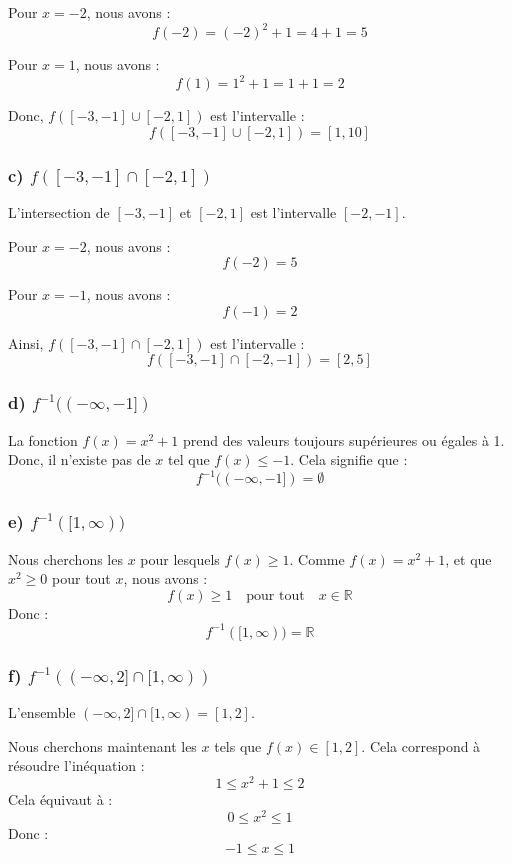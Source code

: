 \documentclass[a4paper,oneside,12pt]{amsbook}
\theoremstyle{definition}
\theoremstyle{remark}
\begin{document}
Pour \( x = -2 \), nous avons :
\[
f(-2) = (-2)^2 + 1 = 4 + 1 = 5
\]

Pour \( x = 1 \), nous avons :
\[
f(1) = 1^2 + 1 = 1 + 1 = 2
\]

Donc, \( f([-3, -1] \cup [-2, 1]) \) est l'intervalle :
\[
f([-3, -1] \cup [-2, 1]) = [1, 10]
\]

\subsubsection*{c) \( f([-3, -1] \cap [-2, 1]) \)}

L'intersection de \( [-3, -1] \) et \( [-2, 1] \) est l'intervalle \( [-2, -1] \).

Pour \( x = -2 \), nous avons :
\[
f(-2) = 5
\]

Pour \( x = -1 \), nous avons :
\[
f(-1) = 2
\]

Ainsi, \( f([-3, -1] \cap [-2, 1]) \) est l'intervalle :
\[
f([-3, -1] \cap [-2, -1]) = [2, 5]
\]

\subsubsection*{d) \( f^{-1}((-\infty, -1]) \)}

La fonction \( f(x) = x^2 + 1 \) prend des valeurs toujours supérieures ou égales à 1. Donc, il n'existe pas de \( x \) tel que \( f(x) \leq -1 \). Cela signifie que :
\[
f^{-1}((-\infty, -1]) = \emptyset
\]

\subsubsection*{e) \( f^{-1}([1, \infty)) \)}

Nous cherchons les \( x \) pour lesquels \( f(x) \geq 1 \). Comme \( f(x) = x^2 + 1 \), et que \( x^2 \geq 0 \) pour tout \( x \), nous avons :
\[
f(x) \geq 1 \quad \text{pour tout} \quad x \in \mathbb{R}
\]
Donc :
\[
f^{-1}([1, \infty)) = \mathbb{R}
\]

\subsubsection*{f) \( f^{-1}((-\infty, 2] \cap [1, \infty)) \)}

L'ensemble \( (-\infty, 2] \cap [1, \infty) = [1, 2] \).

Nous cherchons maintenant les \( x \) tels que \( f(x) \in [1, 2] \). Cela correspond à résoudre l'inéquation :
\[
1 \leq x^2 + 1 \leq 2
\]
Cela équivaut à :
\[
0 \leq x^2 \leq 1
\]
Donc :
\[
-1 \leq x \leq 1
\]
\end{document}
